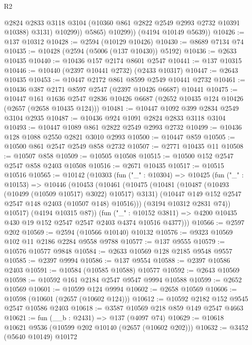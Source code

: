 \begin{lexlean}{R2}
\begin{coremodule}
                  @2824
                  @2833
                  @3118
                  @3104
                  (@10360 @861 @2822 @2549 @2993 @2732 @10391 @10388)
                  @3131)
                @10299))
            @5865)
          @10299))
      (@4194 @10149 @5639))
@10426 := @137 @10312
@10428 := @2594 (@10129 @10426)
@10430 := @8689 @7134 @74
@10435 := @10428 (@2594 (@5006 (@137 @10430)) @5192)
@10436 := @2633 @10435
@10440 := @10436 @157 @2174 @8601 @2547
@10441 := @137 @10315
@10446 := @10440 (@2397 @10441 @2732) (@2433 @10317)
@10447 := @2643 @10435
@10453 := @10447 @2172 @861 @8599 @2549 @10441 @2732
@10461 := @10436 @387 @2171 @8597 @2547 (@2397 @10426 @6687) @10441
@10475 := @10447
    @161
    @1636
    @2547
    @2836
    @10426
    @6687
    (@2652 @10435 @124 @10426 (@2657 (@2658 @10435 @124)))
@10481 := @10447 @1092 @399 @2834 @2549 @3104 @2935
@10487 := @10436 @924 @1091 @2824 @2833 @3118 @3104
@10493 := @10447 @1089 @861 @2822 @2549 @2993 @2732
@10499 := @10436 @128 @1088 @2550 @2821 @3010 @2993
@10500 := @10447 @859
@10505 := @10500 @861 @2547 @2549 @858 @2732
@10507 := @2771 @10435 @11
@10508 := @10507 @858
@10509 := @10505 @10508
@10515 := @10500 @152 @2547 @2547 @858 @2403 @10508
@10516 := @2671 @10435
@10517 := @10515 @10516
@10565 := @10142
    (@10303
      (fun ("_" : @10304) =>
      @10425
        (fun ("_" : @10153) =>
        @10446
          (@10453
            (@10461
              (@10475
                (@10481
                  (@10487 (@10493 (@10499 (@10509 @10517) @3022) @10517) @3131)
                  (@10447 @149 @152 @2547 @2547 @148 @2403 (@10507 @148) @10516)))
              (@3194 @10312 @2831 @74))
            @10517)
          (@4194 @10315 @87))
        (fun ("_" : @10152 @3811) =>
        @4200 @10435 @430 @19 @152 @2547 @2547 @2403 @4374 @10516 @4377)))
@10566 := @2597 @202
@10569 := @2594 (@10566 @10140) @10132
@10576 := @9323 @10569 @102 @11 @2186 @2284 @9558 @9788
@10577 := @137 @9555
@10579 := @10576 @10577 @9848
@10584 := @2633 @10569 @128 @2185 @9548 @9557
@10585 := @2397 @9994
@10586 := @137 @9554
@10588 := @2397 @10586 @2403
@10591 := @10584 (@10585 @10588) @10577
@10592 := @2643 @10569
@10598 := @10592 @161 @2184 @2547 @9547 @9994 @10588
@10599 := @2652 @10569
@10601 := @10599 @124 @9994
@10602 := @2658 @10569
@10606 := @10598 (@10601 (@2657 (@10602 @124)))
@10612 := @10592 @2182 @152 @9545 @2547 @10586 @2403
@10618 := @3587 @10569 @218 @859 @149 @2547 @4663
@10621 := fun (__b : @2431) => @137 (@4097 @74)
@10629 := @10618 @10621 @9536 (@10599 @202 @10140 (@2657 (@10602 @202)))
@10632 := @3452 (@5640 @10149) @10172

\end{coremodule}
\end{lexlean}
